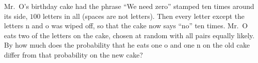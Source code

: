 Mr.\ O's birthday cake had the phrase ``We need zero'' stamped ten times around its side, $100$ letters in all (spaces are not letters). Then every letter except the letters n and o was wiped off, so that the cake now says ``no'' ten times. Mr.\ O eats two of the letters on the cake, chosen at random with all pairs equally likely. By how much does the probability that he eats one o and one n on the old cake differ from that probability on the new cake?
